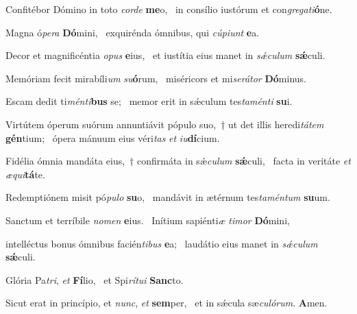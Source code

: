 \item Confitébor Dómino in toto \textit{corde} \textbf{me}o,~\psstar{} in consílio iustórum et con\textit{gregati}\textbf{ó}ne.

\item Magna ó\textit{pera} \textbf{Dó}mini,~\psstar{} exquirénda ómnibus, qui \textit{cúpiunt} \textbf{e}a.

\item Decor et magnificéntia \textit{opus} \textbf{e}ius,~\psstar{} et iustítia eius manet in \textit{sǽculum} \textbf{sǽ}culi.

\item Memóriam fecit mirabíli\textit{um} \textit{su}\textbf{ó}rum,~\psstar{} miséricors et mi\textit{serátor} \textbf{Dó}minus.

\item Escam dedit ti\textit{ménti}\textbf{bus} se;~\psstar{} memor erit in sǽculum tes\textit{taménti} \textbf{su}i.

\item Virtútem óperum suórum annuntiávit pópulo suo,~† ut det illis heredi\textit{tátem} \textbf{gén}tium;~\psstar{} ópera mánuum eius véri\textit{tas} \textit{et} \textit{iu}\textbf{dí}cium.

\item Fidélia ómnia mandáta eius,~† confirmáta in sǽ\textit{culum} \textbf{sǽ}culi,~\psstar{} facta in veritáte \textit{et} \textit{æqui}\textbf{tá}te.

\item Redemptiónem misit pó\textit{pulo} \textbf{su}o,~\psstar{} mandávit in ætérnum tes\textit{taméntum} \textbf{su}um.

\item Sanctum et terríbile \textit{nomen} \textbf{e}ius.~\psstar{} Inítium sapiénti\textit{æ} \textit{timor} \textbf{Dó}mini,

\item intelléctus bonus ómnibus facién\textit{tibus} \textbf{e}a;~\psstar{} laudátio eius manet in \textit{sǽculum} \textbf{sǽ}culi.

\item Glória Pa\textit{tri}, \textit{et} \textbf{Fí}lio,~\psstar{} et Spi\textit{rítui} \textbf{Sanc}to.

\item Sicut erat in princípio, et \textit{nunc}, \textit{et} \textbf{sem}per,~\psstar{} et in sǽcula sæ\textit{culórum}. \textbf{A}men.